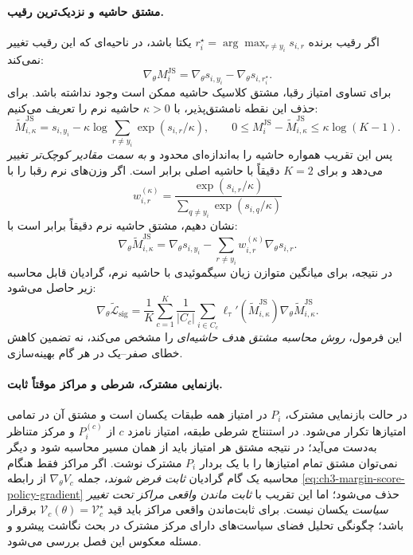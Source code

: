 \paragraph{مشتق حاشیه و نزدیک‌ترین رقیب.}
اگر رقیب برنده
$r_i^\star=\arg\max_{r\ne y_i}s_{i,r}$
یکتا باشد، در ناحیه‌ای
که این رقیب تغییر نمی‌کند:
\begin{equation}\label{eq:ch3-margin-policy-gradient}
\boxed{
\nabla_\theta M_i^{\mathrm{JS}}
=\nabla_\theta s_{i,y_i}
-\nabla_\theta s_{i,r_i^\star}.
}
\end{equation}
برای تساوی امتیاز رقبا،
مشتق کلاسیک حاشیه ممکن
است وجود نداشته باشد.
برای حذف این نقطه نامشتق‌پذیر،
با $\kappa>0$ حاشیه نرم
را تعریف می‌کنیم:
\begin{equation}\label{eq:ch3-margin-smooth-competitor}
\boxed{
\widetilde M_{i,\kappa}^{\mathrm{JS}}
=s_{i,y_i}
-\kappa\log\sum_{r\ne y_i}
\exp(s_{i,r}/\kappa),
\qquad
0\le M_i^{\mathrm{JS}}
-\widetilde M_{i,\kappa}^{\mathrm{JS}}
\le\kappa\log(K-1).
}
\end{equation}
پس این تقریب همواره
حاشیه را به‌اندازه‌ای
محدود و \emph{به سمت
مقادیر کوچک‌تر} تغییر
می‌دهد و برای $K=2$
دقیقاً با حاشیه اصلی
برابر است. اگر وزن‌های
نرم رقبا را با
\[
w_{i,r}^{(\kappa)}
=\frac{\exp(s_{i,r}/\kappa)}
{\sum_{q\ne y_i}\exp(s_{i,q}/\kappa)}
\]
نشان دهیم، مشتق حاشیه
نرم دقیقاً برابر است با:
\begin{equation}\label{eq:ch3-margin-smooth-gradient}
\boxed{
\nabla_\theta\widetilde M_{i,\kappa}^{\mathrm{JS}}
=\nabla_\theta s_{i,y_i}
-\sum_{r\ne y_i}
w_{i,r}^{(\kappa)}
\nabla_\theta s_{i,r}.
}
\end{equation}
در نتیجه، برای میانگین
متوازن زیان سیگموئیدی
با حاشیه نرم، گرادیان
قابل محاسبه زیر حاصل
می‌شود:
\begin{equation}\label{eq:ch3-margin-loss-policy-gradient}
\boxed{
\nabla_\theta\widetilde{\mathcal L}_{\mathrm{sig}}
=\frac1K\sum_{c=1}^{K}\frac1{|C_c|}
\sum_{i\in C_c}
\ell_\tau'\!\left(\widetilde M_{i,\kappa}^{\mathrm{JS}}\right)
\nabla_\theta\widetilde M_{i,\kappa}^{\mathrm{JS}}.
}
\end{equation}
این فرمول،
\emph{روش محاسبه مشتق
هدف حاشیه‌ای} را مشخص
می‌کند، نه تضمین کاهش
خطای صفر--یک در هر
گام بهینه‌سازی.

\paragraph{بازنمایی مشترک، شرطی و مراکز موقتاً ثابت.}
در حالت بازنمایی مشترک،
$P_i$ در امتیاز همه
طبقات یکسان است و
مشتق آن در تمامی امتیازها
تکرار می‌شود. در
استنتاج شرطی طبقه،
امتیاز نامزد $c$
از $P_i^{(c)}$ و
مرکز متناظر به‌دست
می‌آید؛ در نتیجه
مشتق هر امتیاز باید
از همان مسیر محاسبه
شود و دیگر نمی‌توان
مشتق تمام امتیازها را
با یک بردار $P_i$
مشترک نوشت.
اگر مراکز فقط هنگام
محاسبه یک گام گرادیان
\emph{ثابت فرض شوند}،
جمله
$\nabla_\theta V_c$
از رابطه
\eqref{eq:ch3-margin-score-policy-gradient}
حذف می‌شود؛ اما این
تقریب با \emph{ثابت
ماندن واقعی مراکز
تحت تغییر سیاست}
یکسان نیست. برای
ثابت‌ماندن واقعی
مراکز باید قید
$\mathcal V_c(\theta)
=\mathcal V_c^\star$
برقرار باشد؛ چگونگی
تحلیل فضای سیاست‌های
دارای مرکز مشترک
در بحث نگاشت پیشرو
و مسئله معکوس این فصل
بررسی می‌شود.

